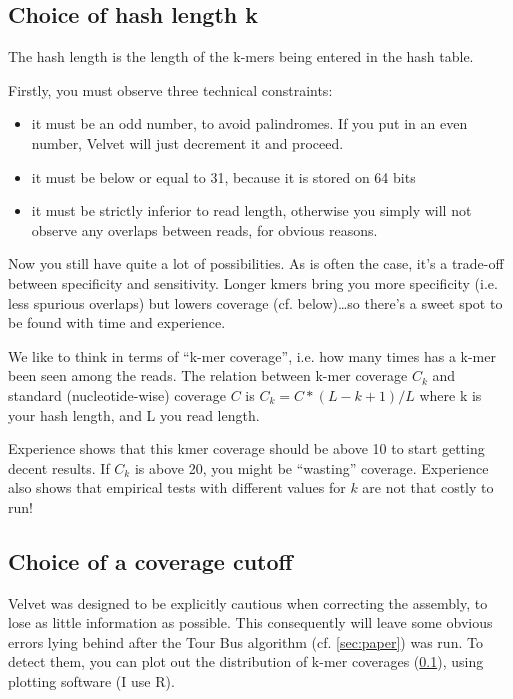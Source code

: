 \documentclass{article}
\begin{document}
\subsection{Choice of hash length k}

\label{sec:kmercov}

The hash length is the length of the k-mers being entered in the hash table.

Firstly, you must observe three technical constraints:
\begin{itemize}
\item it must be an odd number, to avoid palindromes. If you put in an even number, Velvet will just decrement it and proceed.
\item it must be below or equal to 31, because it is stored on 64 bits
\item it must be strictly inferior to read length, otherwise you simply will not observe any overlaps between reads, for obvious reasons.
\end{itemize}

Now you still have quite a lot of possibilities. As is often the case, it's a trade-off between specificity and sensitivity. Longer kmers bring you more specificity (i.e. less spurious overlaps) but lowers coverage (cf. below)\ldots so there's a sweet spot to be found with time and experience.

We like to think in terms of ``k-mer coverage'', i.e. how many times has a k-mer been seen among the reads. The relation between k-mer coverage $C_k$ and standard (nucleotide-wise) coverage $C$ is $C_k = C * (L - k + 1) / L$ where k is your hash length, and L you read length. 

Experience shows that this kmer coverage should be above 10 to start getting decent results. If $C_k$ is above 20, you might be ``wasting'' coverage. Experience also shows that empirical tests with different values for $k$ are not that costly to run!

\subsection{Choice of a coverage cutoff}

\label{sec:covcutoff}

Velvet was designed to be explicitly cautious when correcting the assembly, to lose as little information as possible. This consequently will leave some obvious errors lying behind after the Tour Bus algorithm (cf. \ref{sec:paper}) was run. To detect them, you can plot out the distribution of k-mer coverages (\ref{sec:kmercov}), using plotting software (I use R).
\end{document}
